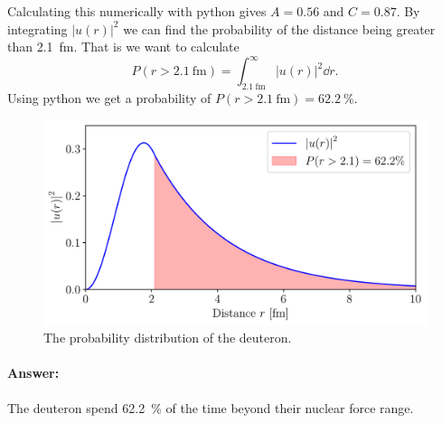 Calculating this numerically with python gives $A = 0.56$ and $C = 0.87$. By integrating $|u(r)|^2$ we can find the probability of the distance being greater than \SI{2.1}{\femto\m}. That is we want to calculate
\begin{equation}
	P(r > \SI{2.1}{\femto\m}) = \int_{\SI{2.1}{\femto\m}}^\infty |u(r)|^2 \dd r.
\end{equation}
Using python we get a probability of $P(r > \SI{2.1}{\femto\m}) = \SI{62.2}{\percent}$.

\begin{figure}[H]
	\centering
	\includegraphics[width=\textwidth]{./code/Exercise4.pdf}
	\caption{The probability distribution of the deuteron.}
\end{figure}

\paragraph{Answer:} The deuteron spend \SI{62.2}{\percent} of the time beyond their nuclear force range.